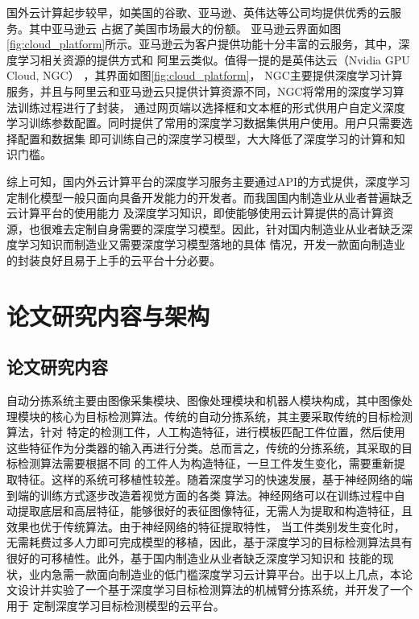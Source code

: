 国外云计算起步较早，如美国的谷歌、亚马逊、英伟达等公司均提供优秀的云服务。其中亚马逊云  \cite{AWSyun}占据了美国市场最大的份额。
亚马逊云界面如图\ref{fig:cloud_platform}所示。亚马逊云为客户提供功能十分丰富的云服务，其中，深度学习相关资源的提供方式和
阿里云类似。值得一提的是英伟达云（Nvidia GPU Cloud, NGC）    \cite{NVIDIAyun}，其界面如图\ref{fig:cloud_platform}，
NGC主要提供深度学习计算服务，并且与阿里云和亚马逊云只提供计算资源不同，NGC将常用的深度学习算法训练过程进行了封装，
通过网页端以选择框和文本框的形式供用户自定义深度学习训练参数配置。同时提供了常用的深度学习数据集供用户使用。用户只需要选择配置和数据集
即可训练自己的深度学习模型，大大降低了深度学习的计算和知识门槛。

综上可知，国内外云计算平台的深度学习服务主要通过API的方式提供，深度学习定制化模型一般只面向具备开发能力的开发者。而我国国内制造业从业者普遍缺乏云计算平台的使用能力
及深度学习知识，即使能够使用云计算提供的高计算资源，也很难去定制自身需要的深度学习模型。因此，针对国内制造业从业者缺乏深度学习知识而制造业又需要深度学习模型落地的具体
情况，开发一款面向制造业的封装良好且易于上手的云平台十分必要。


\section{论文研究内容与架构}
\subsection{论文研究内容}
自动分拣系统主要由图像采集模块、图像处理模块和机器人模块构成，其中图像处理模块的核心为目标检测算法。传统的自动分拣系统，其主要采取传统的目标检测算法，针对
特定的检测工件，人工构造特征，进行模板匹配工件位置，然后使用这些特征作为分类器的输入再进行分类。总而言之，传统的分拣系统，其采取的目标检测算法需要根据不同
的工件人为构造特征，一旦工件发生变化，需要重新提取特征。这样的系统可移植性较差。随着深度学习的快速发展，基于神经网络的端到端的训练方式逐步改造着视觉方面的各类
算法。神经网络可以在训练过程中自动提取底层和高层特征，能够很好的表征图像特征，无需人为提取和构造特征，且效果也优于传统算法。由于神经网络的特征提取特性，
当工件类别发生变化时，无需耗费过多人力即可完成模型的移植，因此，基于深度学习的目标检测算法具有很好的可移植性。此外，基于国内制造业从业者缺乏深度学习知识和
技能的现状，业内急需一款面向制造业的低门槛深度学习云计算平台。出于以上几点，本论文设计并实验了一个基于深度学习目标检测算法的机械臂分拣系统，并开发了一个用于
定制深度学习目标检测模型的云平台。

